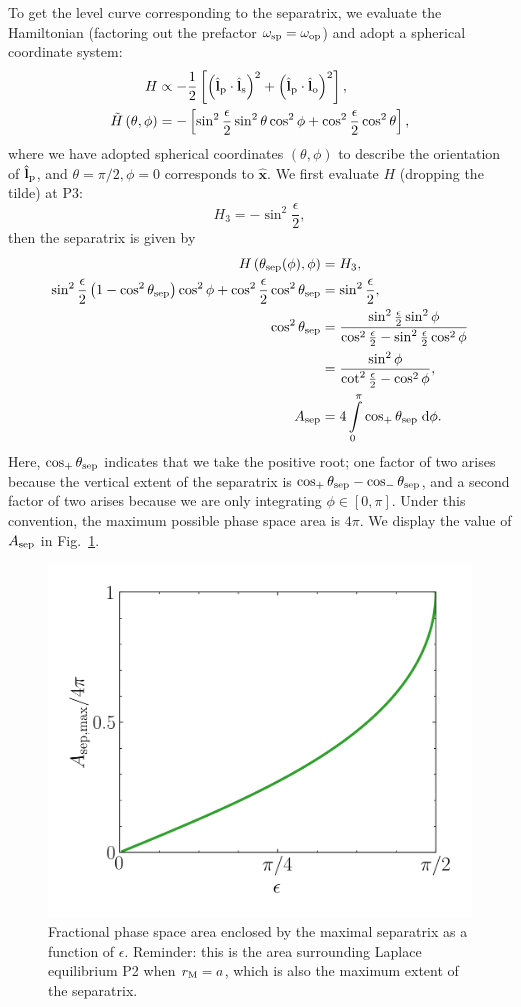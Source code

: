 \documentclass[11pt,
        usenames, %
        dvipsnames %
    ]{article}
\newcommand*{\bm}[1]{\boldsymbol{\mathbf{#1}}}
\newcommand*{\uv}[1]{\hat{\bm{#1}}}
\newcommand*{\p}[1]{\left(#1\right)}
\newcommand*{\s}[1]{\left[#1\right]}
\begin{document}
To get the level curve corresponding to the separatrix, we evaluate the
Hamiltonian (factoring out the prefactor $\omega_{\rm sp} = \omega_{\rm op}$)
and adopt a spherical coordinate system:
\begin{align}
    H &\propto -\frac{1}{2} \s{
        \p{\uv{l}_{\rm p} \cdot \uv{l}_{\rm s}}^2
        + \p{\uv{l}_{\rm p} \cdot \uv{l}_{\rm o}}^2},\\
    \tilde{H}\p{\theta, \phi} &= -\s{
        \sin^2\frac{\epsilon}{2}\sin^2\theta\cos^2\phi
        + \cos^2\frac{\epsilon}{2} \cos^2\theta},
\end{align}
where we have adopted spherical coordinates $(\theta, \phi)$ to describe the
orientation of $\uv{l}_{\rm p}$, and $\theta = \pi/2, \phi = 0$ corresponds to
$\uv{x}$. We first evaluate $H$ (dropping the tilde) at P3:
\begin{equation}
    H_3 = -\sin^2\frac{\epsilon}{2},
\end{equation}
then the separatrix is given by
\begin{align}
    H\p{\theta_{\rm sep}(\phi), \phi} &= H_3,\\
    \sin^2\frac{\epsilon}{2}\p{1 - \cos^2\theta_{\rm sep}}\cos^2\phi
        + \cos^2\frac{\epsilon}{2} \cos^2\theta_{\rm sep}
        &= \sin^2\frac{\epsilon}{2},\\
    \cos^2\theta_{\rm sep} &= \frac{\sin^2\frac{\epsilon}{2}\sin^2\phi}{
            \cos^2\frac{\epsilon}{2} -
            \sin^2\frac{\epsilon}{2}\cos^2\phi}\nonumber\\
        &= \frac{\sin^2\phi}{\cot^2\frac{\epsilon}{2} - \cos^2\phi},\\
    A_{\rm sep} &= 4\int\limits_0^\pi \cos_+\theta_{\rm sep}\;\mathrm{d}\phi.
\end{align}
Here, $\cos_+\theta_{\rm sep}$ indicates that we take the positive root; one
factor of two arises because the vertical extent of the separatrix is
$\cos_+\theta_{\rm sep} - \cos_- \theta_{\rm sep}$, and a second factor of two
arises because we are only integrating $\phi \in [0, \pi]$. Under this
convention, the maximum possible phase space area is $4\pi$. We display the
value of $A_{\rm sep}$ in Fig.~\ref{fig:laplace}.
\begin{figure}
    \centering
    \includegraphics[width=0.5\columnwidth]{laplace.png}
    \caption{Fractional phase space area enclosed by the maximal separatrix as a
    function of $\epsilon$. Reminder: this is the area surrounding Laplace
    equilibrium P2 when $r_{\rm M} = a$, which is also the maximum extent of the
    separatrix.}\label{fig:laplace}
\end{figure}
\end{document}

